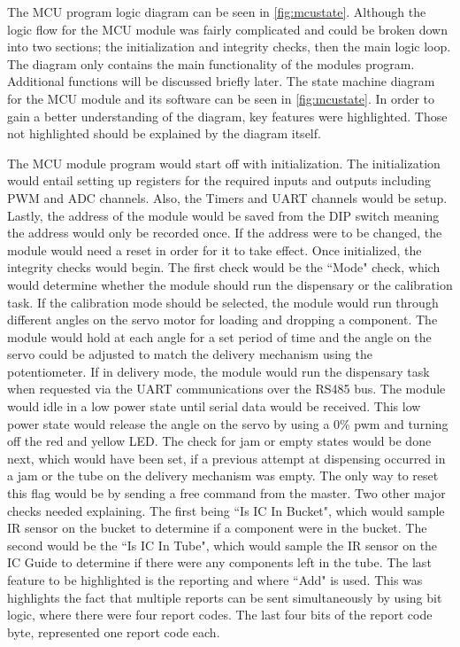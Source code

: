 \documentclass[a4paper,11pt]{article}
\numberwithin{figure}{section}
\numberwithin{table}{section}
\begin{document}
The MCU program  logic diagram can be seen in \autoref{fig:mcustate}. Although the logic flow for the MCU module was fairly complicated and could be broken down into two sections; the initialization and integrity checks, then the main logic loop. The diagram only contains the main functionality of the modules program. Additional functions will be discussed briefly later. The state machine diagram for the MCU module and its software can be seen in \autoref{fig:mcustate}. In order to gain a better understanding of the diagram, key features were highlighted. Those not highlighted should be explained by the diagram itself. 

The MCU module program would start off with initialization. The initialization would entail setting up registers for the required inputs and outputs including PWM and ADC channels. Also, the Timers and UART channels would be setup. Lastly, the address of the module would be saved from the DIP switch meaning the address would only be recorded once. If the address were to be changed, the module would need a reset in order for it to take effect. Once initialized, the integrity checks would begin. The first check would be the ``Mode" check, which would determine whether the module should run the dispensary or the calibration task. If the calibration mode should be selected, the module would run through different angles on the servo motor for loading and dropping a component. The module would hold at each angle for a set period of time and the angle on the servo could be adjusted to match the delivery mechanism using the potentiometer. If in delivery mode, the module would run the dispensary task when requested via the UART communications over the RS485 bus. The module would idle in a low power state until serial data would be received. This low power state would release the angle on the servo by using a 0\% pwm and turning off the red and yellow LED. The check for jam or empty states would be done next, which would have been set, if a previous attempt at dispensing occurred in a jam or the tube on the delivery mechanism was empty. The only way to reset this flag would be by sending a free command from the master. Two other major checks needed explaining. The first being ``Is IC In Bucket", which would sample IR sensor on the bucket to determine if a component were in the bucket. The second would be the ``Is IC In Tube", which would sample the IR sensor on the IC Guide to determine if there were any components left in the tube. The last feature to be highlighted is the reporting and where ``Add" is used. This was highlights the fact that multiple reports can be sent simultaneously by using bit logic, where there were four report codes. The last four bits of the report code byte, represented one report code each.
\end{document}
